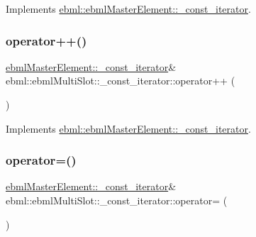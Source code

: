Implements \mbox{\hyperlink{classebml_1_1ebmlMasterElement_1_1__const__iterator_aa3e5459826695a9043745fbbaea9cd47}{ebml\+::ebml\+Master\+Element\+::\+\_\+const\+\_\+iterator}}.

\mbox{\label{classebml_1_1ebmlMultiSlot_1_1__const__iterator_a4d9425007a96cb4803ef3cff5bf88e00}} 
\subsubsection{\texorpdfstring{operator++()}{operator++()}}
{\footnotesize\ttfamily \mbox{\hyperlink{classebml_1_1ebmlMasterElement_1_1__const__iterator}{ebml\+Master\+Element\+::\+\_\+const\+\_\+iterator}}\& ebml\+::ebml\+Multi\+Slot\+::\+\_\+const\+\_\+iterator\+::operator++ (\begin{DoxyParamCaption}{ }\end{DoxyParamCaption})\hspace{0.3cm}{\ttfamily [virtual]}}



Implements \mbox{\hyperlink{classebml_1_1ebmlMasterElement_1_1__const__iterator_a439f540325443a3c3a3acdcd8df81553}{ebml\+::ebml\+Master\+Element\+::\+\_\+const\+\_\+iterator}}.

\mbox{\label{classebml_1_1ebmlMultiSlot_1_1__const__iterator_a6e2de45285786f1045fef8be51974b0b}} 
\subsubsection{\texorpdfstring{operator=()}{operator=()}}
{\footnotesize\ttfamily \mbox{\hyperlink{classebml_1_1ebmlMasterElement_1_1__const__iterator}{ebml\+Master\+Element\+::\+\_\+const\+\_\+iterator}}\& ebml\+::ebml\+Multi\+Slot\+::\+\_\+const\+\_\+iterator\+::operator= (\begin{DoxyParamCaption}\item[{const \mbox{\hyperlink{classebml_1_1ebmlMasterElement_1_1__const__iterator}{ebml\+Master\+Element\+::\+\_\+const\+\_\+iterator}} \&}]{ }\end{DoxyParamCaption})\hspace{0.3cm}{\ttfamily [virtual]}}



